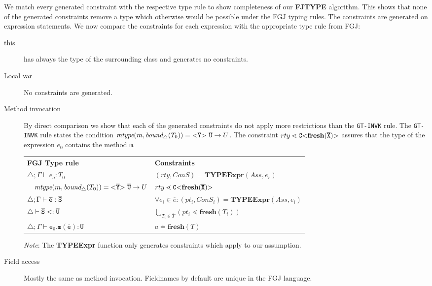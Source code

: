 \documentclass[runningheads]{llncs}
\begin{document}
We match every generated constraint with the respective type rule to show completeness of our \textbf{FJTYPE} algorithm.
This shows that none of the generated constraints remove a type which otherwise would be possible under the FGJ typing rules.
The constraints are generated on expression statements.
We now compare the constraints for each expression with the appropriate type rule from FGJ:
\begin{description}
  \item [this]
  has always the type of the surrounding class and generates no constraints.
  \item [Local var]
  No constraints are generated.
  \item[Method invocation]
By direct comparison we show that each of the generated constraints do not apply more restrictions than the \texttt{GT-INVK} rule.
The \texttt{GT-INVK} rule states the condition $\textit{mtype}(m, \textit{bound}_\triangle(T_0)) = \mathtt{ {\tt <} \overline{\tt Y} {\tt >} }\ \overline{\tt U} \to U$.
The constraint $rty \lessdot \mathtt{C {\tt <} \textbf{fresh}(\overline{\tt X}) {\tt >} }$ assures that the type of the expression $e_0$ contains the method \texttt{m}.

\begin{tabular}{l|l}
  \textbf{FGJ Type rule} & \textbf{Constraints} \\
  $\triangle; \Gamma \vdash e_o : T_0$ & $(rty, ConS) = \textbf{TYPEExpr}(Ass, e_r)$\\ 
  $\quad \textit{mtype}(m, \textit{bound}_\triangle(T_0)) = \exptype{}{\ol{Y}}\ \ol{U} \to U$ & $rty \lessdot \mathtt{C {\tt <} \textbf{fresh}(\overline{\tt X}) {\tt >} }$ \\
 $\triangle; \Gamma \vdash \overline{\tt e} : \overline{\tt S}$ & $\forall e_i \in \overline{e} : (pt_i, ConS_i) = \textbf{TYPEExpr}(Ass, e_i)$\\
 $\triangle \vdash \overline{\tt S} <: \overline{\tt U}$ & $ \bigcup_{T_i \in \overline{T}} (pt_i \lessdot \textbf{fresh}(T_i))$\\
 $\triangle; \Gamma \vdash \mathtt{e_0.m(\overline{e}) : U }$ & $a \doteq \textbf{fresh}(T)$ \\
\end{tabular}

\textit{Note}: The \textbf{TYPEExpr} function only generates constraints which apply to our assumption.
 \item[Field access]
Mostly the same as method invocation.
Fieldnames by default are unique in the FGJ language.


\end{description}
\end{document}
